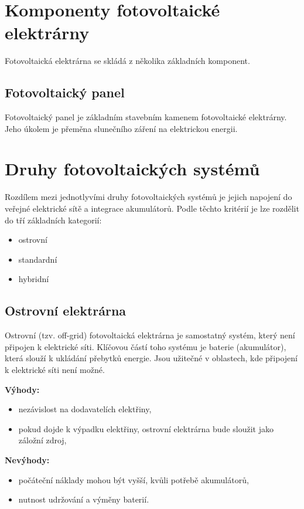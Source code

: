 \section{Komponenty fotovoltaické elektrárny}

Fotovoltaická elektrárna se skládá z několika základních komponent.
\subsection{Fotovoltaický panel}

Fotovoltaický panel je základním stavebním kamenem fotovoltaické elektrárny. Jeho úkolem je přeměna slunečního záření na elektrickou energii.



\section{Druhy fotovoltaických systémů}

Rozdílem mezi jednotlyvími druhy fotovoltaických systémů je jejich napojení do veřejné elektrické sítě a integrace akumulátorů.
Podle těchto kritérií je lze rozdělit do tří základních kategorií:

\begin{itemize}
    \item ostrovní
    \item standardní
    \item hybridní
\end{itemize}

\subsection{Ostrovní elektrárna}

Ostrovní (tzv. off-grid) fotovoltaická elektrárna je samostatný systém, který není připojen k elektrické síti.
Klíčovou částí toho systému je baterie (akumulátor), která slouží k ukládání přebytků energie.
Jsou užitečné v oblastech, kde připojení k elektrické síti není možné.

\newpage

\begin{multicols}{2}
    \textbf{Výhody:}
    \begin{itemize}[leftmargin=*]
        \item nezávislost na dodavatelích elektřiny,
        \item pokud dojde k výpadku elektřiny, ostrovní elektrárna bude sloužit jako záložní zdroj,
    \end{itemize}
    
    \columnbreak
    
    \textbf{Nevýhody:}
    \begin{itemize}[leftmargin=*]
        \item počáteční náklady mohou být vyšší, kvůli potřebě akumulátorů,
        \item nutnost udržování a výměny baterií.
    \end{itemize}
\end{multicols}

